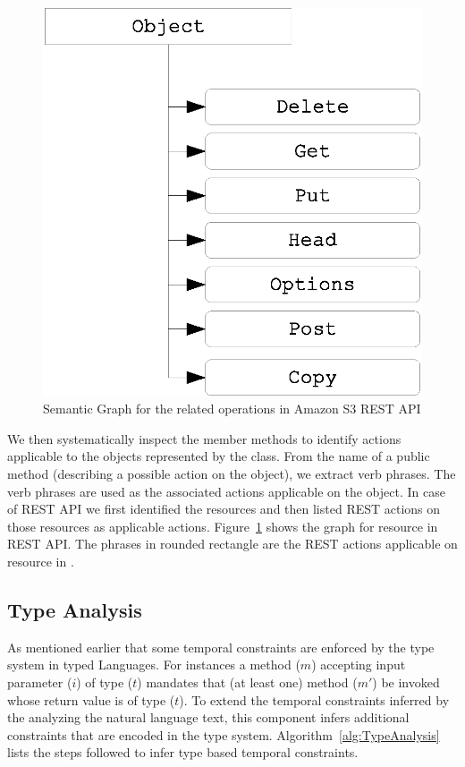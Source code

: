\begin{figure}
	\centering
		\includegraphics[scale=0.4]{KnowledgeGraph.eps}
	\caption{Semantic Graph for the  related operations in Amazon S3 REST API}
	\label{fig:knowledge}
\end{figure} 


We then systematically inspect the member methods to identify actions applicable to the objects represented by the class. From the name of a public method (describing a possible action on the object), we extract verb phrases. The verb phrases are used as the associated actions applicable on the object. In case of REST API we first identified the resources and then listed REST actions on those resources as applicable actions. Figure~\ref{fig:knowledge} shows the graph for  resource in REST API. The phrases in rounded rectangle are the REST actions applicable on  resource in \amazonAPI.
  

\subsection{Type Analysis}

As mentioned earlier that some temporal constraints are enforced by the type system in typed Languages.
For instances a method ($m$) accepting input parameter ($i$) of type ($t$) mandates that (at least one) method ($m'$) be invoked whose return value is of type ($t$).
To extend the temporal constraints inferred by the analyzing the natural language text, this component infers additional constraints that are encoded
in the type system. Algorithm~\ref{alg:TypeAnalysis} lists the steps followed to infer type based temporal constraints.


